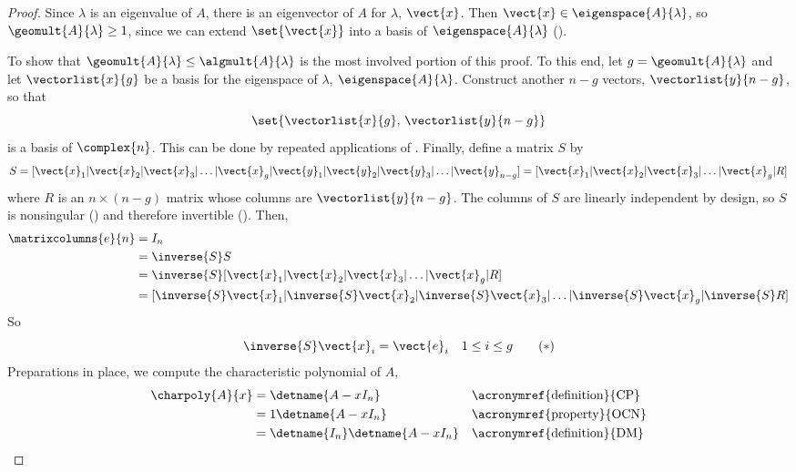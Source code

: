 %
\begin{proof}
Since $\lambda$ is an eigenvalue of $A$, there is an eigenvector of $A$ for $\lambda$, $\vect{x}$.  Then $\vect{x}\in\eigenspace{A}{\lambda}$, so $\geomult{A}{\lambda}\geq 1$, since we can extend $\set{\vect{x}}$ into a basis of $\eigenspace{A}{\lambda}$ ().\par
%
To show that $\geomult{A}{\lambda}\leq\algmult{A}{\lambda}$ is the most involved portion of this proof.  To this end, let $g=\geomult{A}{\lambda}$ and let $\vectorlist{x}{g}$ be a basis for the eigenspace of $\lambda$, $\eigenspace{A}{\lambda}$.  Construct another $n-g$ vectors, $\vectorlist{y}{n-g}$, so that
%
\begin{equation*}
\set{\vectorlist{x}{g},\,\vectorlist{y}{n-g}}
\end{equation*}
%
is a basis of $\complex{n}$.  This can be done by repeated applications of .  Finally, define a matrix $S$ by
%
\begin{equation*}
S=[\vect{x}_1|\vect{x}_2|\vect{x}_3|\ldots|\vect{x}_g|\vect{y}_1|\vect{y}_2|\vect{y}_3|\ldots|\vect{y}_{n-g}]
=[\vect{x}_1|\vect{x}_2|\vect{x}_3|\ldots|\vect{x}_g|R]
\end{equation*}
%
where $R$ is an $n\times(n-g)$ matrix whose columns are $\vectorlist{y}{n-g}$.  The columns of $S$ are linearly independent by design, so $S$ is nonsingular () and therefore invertible ().  Then,
%
\begin{align*}
\matrixcolumns{e}{n}&=I_n\\
&=\inverse{S}S\\
&=\inverse{S}[\vect{x}_1|\vect{x}_2|\vect{x}_3|\ldots|\vect{x}_g|R]\\
&=[\inverse{S}\vect{x}_1|\inverse{S}\vect{x}_2|\inverse{S}\vect{x}_3|\ldots|\inverse{S}\vect{x}_g|\inverse{S}R]
\end{align*}
%
So
%
\begin{equation*}
\inverse{S}\vect{x}_i=\vect{e}_i\quad 1\leq i\leq g\tag{$*$}
\end{equation*}
%
Preparations in place, we compute the characteristic polynomial of $A$,
%
\begin{align*}
\charpoly{A}{x}&=\detname{A-xI_n}&&\text{\acronymref{definition}{CP}}\\
&=1\detname{A-xI_n}&&\text{\acronymref{property}{OCN}}\\
&=\detname{I_n}\detname{A-xI_n}&&\text{\acronymref{definition}{DM}}\\

\end{align*}
\end{proof}
